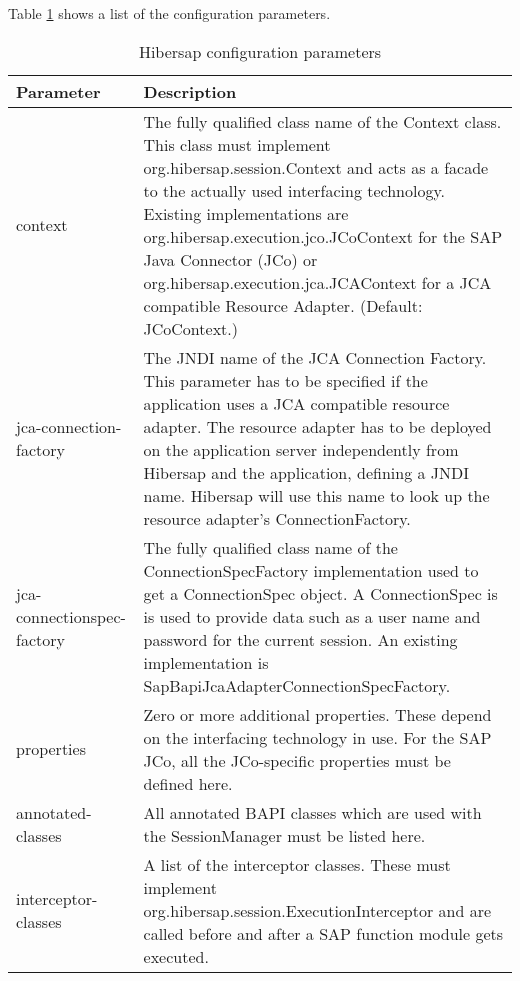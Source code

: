 Table \ref{tab:ConfigurationParameters} shows a list of the configuration parameters.

\begin{table}[H]
  \renewcommand{\arraystretch}{1.5}
  \centering
   \begin{tabularx}{\textwidth}{ l X }
    \toprule
    \textbf{Parameter}      & \textbf{Description} \\ 
    \midrule
    context                 &     
    The fully qualified class name of the Context class. This class must implement org.hibersap.session.Context and acts as a facade to
    the actually used interfacing technology. Existing 
    implementations are org.hibersap.execution.jco.JCoContext for the SAP Java Connector (JCo) or org.hibersap.execution.jca.JCAContext 
    for a JCA compatible Resource Adapter. (Default: JCoContext.) 
    \\
    jca-connection-factory  & 
    The JNDI name of the JCA Connection Factory. This parameter has to be specified if the application uses a JCA compatible resource 
    adapter. The resource adapter has to be deployed on the application server independently from Hibersap and the application, defining 
    a JNDI name. Hibersap will use this name to look up the resource adapter's ConnectionFactory. 
    \\
    jca-connectionspec-factory &
    The fully qualified class name of the ConnectionSpecFactory implementation used to get a ConnectionSpec object. A ConnectionSpec is
    is used to provide data such as a user name and password for the current session. An existing implementation is 
    SapBapiJcaAdapterConnectionSpecFactory.
    \\
    properties                   & 
    Zero or more additional properties. These depend on the interfacing technology in use. For the SAP JCo, all the JCo-specific 
    properties must be defined here. 
    \\
    annotated-classes        & 
    All annotated BAPI classes which are used with the SessionManager must be listed here. 
    \\
    interceptor-classes       & 
    A list of the interceptor classes. These must implement org.hibersap.session.ExecutionInterceptor and are called before and after a 
    SAP function module gets executed. \\ 
    \bottomrule
  \end{tabularx}
  \caption{Hibersap configuration parameters}
  \label{tab:ConfigurationParameters}
\end{table}

